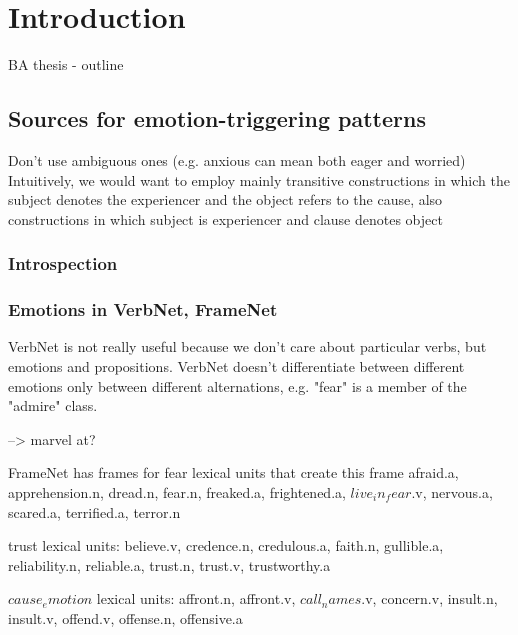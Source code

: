 
\chapter{Introduction} %

\label{ch:introduction} %


BA thesis - outline

\section{Sources for emotion-triggering patterns}

Don't use ambiguous ones (e.g. anxious can mean both eager and worried)
Intuitively, we would want to employ mainly transitive constructions in which the subject denotes the experiencer and the object refers to the cause, also constructions in which subject is experiencer and clause denotes object



\subsection{Introspection}



\subsection{Emotions in VerbNet, FrameNet}
VerbNet is not really useful because we don't care about particular verbs, but emotions and propositions. VerbNet doesn't differentiate between different emotions only between different alternations, e.g. "fear" is a member of the "admire" class.

--> marvel at?

FrameNet has frames for
fear
lexical units that create this frame
afraid.a, apprehension.n, dread.n, fear.n, freaked.a, frightened.a, $live_in_fear$.v, nervous.a, scared.a, terrified.a, terror.n

trust
lexical units: believe.v, credence.n, credulous.a, faith.n, gullible.a, reliability.n, reliable.a, trust.n, trust.v, trustworthy.a

$cause_emotion$
lexical units: affront.n, affront.v, $call_names$.v, concern.v, insult.n, insult.v, offend.v, offense.n, offensive.a



